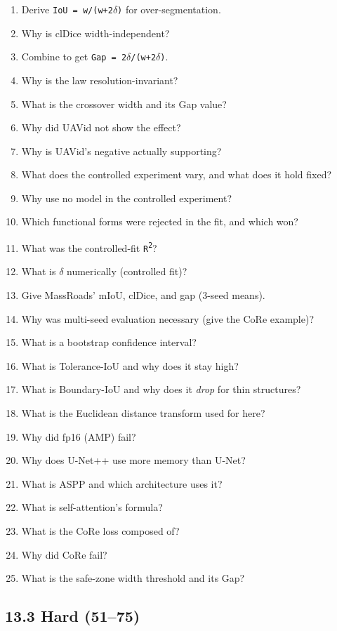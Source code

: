 \documentclass[11pt]{article}
\begin{document}
\begin{enumerate}\setlength{\itemsep}{1pt}
\item Derive \texttt{IoU = w/(w+2$\delta$)} for over-segmentation.
\item Why is clDice width-independent?
\item Combine to get \texttt{Gap = 2$\delta$/(w+2$\delta$)}.
\item Why is the law resolution-invariant?
\item What is the crossover width and its Gap value?
\item Why did UAVid not show the effect?
\item Why is UAVid's negative actually supporting?
\item What does the controlled experiment vary, and what does it hold fixed?
\item Why use no model in the controlled experiment?
\item Which functional forms were rejected in the fit, and which won?
\item What was the controlled-fit \texttt{R\textsuperscript{2}}?
\item What is \texttt{$\delta$} numerically (controlled fit)?
\item Give MassRoads' mIoU, clDice, and gap (3-seed means).
\item Why was multi-seed evaluation necessary (give the CoRe example)?
\item What is a bootstrap confidence interval?
\item What is Tolerance-IoU and why does it stay high?
\item What is Boundary-IoU and why does it \textit{drop} for thin structures?
\item What is the Euclidean distance transform used for here?
\item Why did fp16 (AMP) fail?
\item Why does U-Net++ use more memory than U-Net?
\item What is ASPP and which architecture uses it?
\item What is self-attention's formula?
\item What is the CoRe loss composed of?
\item Why did CoRe fail?
\item What is the safe-zone width threshold and its Gap?
\end{enumerate}

\subsection*{13.3 Hard (51--75)}
\end{document}
